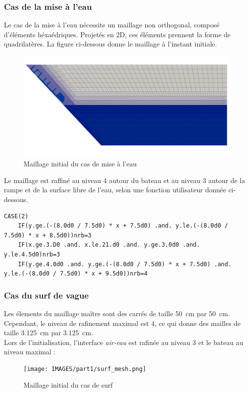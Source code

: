 \documentclass[../main.tex]{subfiles}
\begin{document}
\subsubsection{Cas de la mise à l'eau}

Le cas de la mise à l'eau nécessite un maillage non orthogonal, composé d'éléments héxaédriques. Projetés en 2D, ces éléments prennent la forme de quadrilatères. La figure ci-dessous donne le maillage à l'instant initiale.

\begin{figure}[H]
    \centering
    \includegraphics[width=12cm]{IMAGES/part1/mesh_zephyr_lanching.png}
    \caption{Maillage initial du cas de mise à l'eau}
\end{figure}

Le maillage est raffiné au niveau 4 autour du bateau et au niveau 3 autour de la rampe et de la surface libre de l'eau, selon une fonction utilisateur donnée ci-dessous.
\begin{lstlisting}[style=f90, caption={Maillge utilisateur pour le cas de la mise à l'eau}, captionpos=b]
    CASE(2)
    IF(y.ge.(-(8.0d0 / 7.5d0) * x + 7.5d0) .and. y.le.(-(8.0d0 / 7.5d0) * x + 8.5d0))nrb=3
    IF(x.ge.3.D0 .and. x.le.21.d0 .and. y.ge.3.0d0 .and. y.le.4.5d0)nrb=3
    IF(y.ge.4.0d0 .and. y.ge.(-(8.0d0 / 7.5d0) * x + 7.5d0) .and. y.le.(-(8.0d0 / 7.5d0) * x + 9.5d0))nrb=4
\end{lstlisting}


\subsubsection{Cas du surf de vague}

Les élements du maillage maître sont des carrés de taille \qty{50}{\cm} par \qty{50}{\cm}. Cependant, le niveau de rafinement maximal est $4$, ce qui donne des mailles de taille \qty{3.125}{\cm} par \qty{3.125}{\cm}.\\
Lors de l'initialisation, l'interface \textit{air-eau} est rafinée au niveau $3$ et le bateau au niveau maximal :
\begin{figure}[H]
    \centering
    \texttt{[image: IMAGES/part1/surf\_mesh.png]}
    \caption{Maillage initial du cas de surf}
\end{figure}
\end{document}
